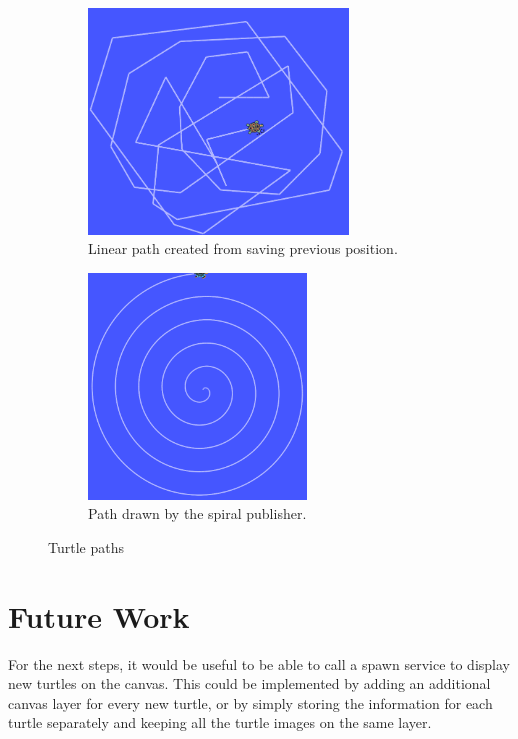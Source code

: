         \begin{figure}[hb]
            \centering
            \begin{subfigure}{.55\textwidth}
                \centering
                \includegraphics[height=6cm]{Images/02_linePath.png}
                \caption{Linear path created from saving previous position.}
                \label{fig:linePath}
            \end{subfigure}%
            \begin{subfigure}{.45\textwidth}
                \centering
                \includegraphics[height=6cm]{Images/02_turtleSpiral.png}
                \caption{Path drawn by the spiral publisher.}
                \label{fig:spiralPath}
            \end{subfigure}
            \caption{Turtle paths}
            \label{fig:turtlePaths}
        \end{figure}
    
    
    
    \section{Future Work}
    
        For the next steps, it would be useful to be able to call a spawn service to display new turtles on the canvas. This could be implemented by adding an additional canvas layer for every new turtle, or by simply storing the information for each turtle separately and keeping all the turtle images on the same layer.